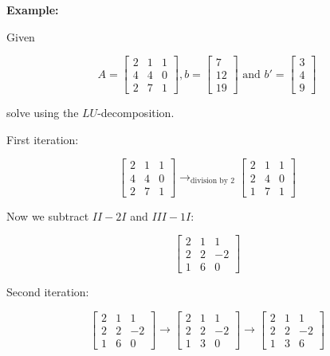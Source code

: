 \textbf{Example:}

Given

\[
    A = 
    \begin{bmatrix}
        2 & 1 & 1 \\ 
        4 & 4 & 0 \\ 
        2 & 7 & 1
    \end{bmatrix}, 
    b = 
    \begin{bmatrix}
        7 \\ 
        12 \\ 
        19
    \end{bmatrix}
    \text{ and }
    b' = 
    \begin{bmatrix}
        3 \\ 
        4 \\ 
        9
    \end{bmatrix}
\]

solve using the \(LU\)-decomposition.

First iteration:

\[
    \begin{bmatrix}
        2 & 1 & 1 \\ 
        4 & 4 & 0 \\ 
        2 & 7 & 1
    \end{bmatrix}  
    \rightarrow_{\text{division by 2}} 
    \begin{bmatrix}
        2 & 1 & 1 \\ 
        2 & 4 & 0 \\ 
        1 & 7 & 1
    \end{bmatrix}
\]

Now we subtract \(II - 2I\) and \(III - 1I\):

\[
    \begin{bmatrix}
        2 & 1 & 1 \\ 
        2 & 2 & -2 \\ 
        1 & 6 & 0
    \end{bmatrix}
\]

Second iteration:

\[
    \begin{bmatrix}
        2 & 1 & 1 \\ 
        2 & 2 & -2 \\ 
        1 & 6 & 0
    \end{bmatrix}
    \rightarrow 
    \begin{bmatrix}
        2 & 1 & 1 \\ 
        2 & 2 & -2 \\ 
        1 & 3 & 0
    \end{bmatrix}
    \rightarrow
    \begin{bmatrix}
        2 & 1 & 1 \\ 
        2 & 2 & -2 \\ 
        1 & 3 & 6
    \end{bmatrix}
\]

